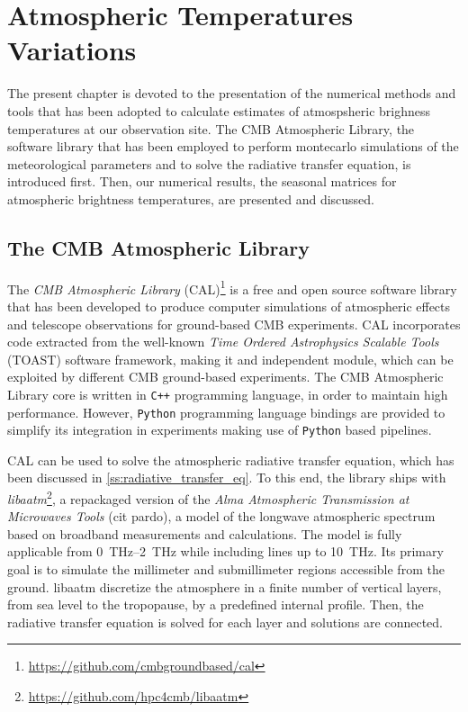 \chapter{Atmospheric Temperatures Variations}\label{ch:atm_variations}

The present chapter is devoted to the presentation of the numerical methods
and tools that has been adopted to calculate estimates of atmospsheric
brighness temperatures at our observation site. The CMB Atmospheric
Library, the software library that has been employed to perform
montecarlo simulations of the meteorological parameters and to solve the
radiative transfer equation, is introduced first. Then, our numerical
results, the seasonal matrices for atmospheric brightness
temperatures, are presented and discussed.

\section{The CMB Atmospheric Library}

The \emph{CMB Atmospheric Library}
(CAL)\footnote{\url{https://github.com/cmbgroundbased/cal}} is a free and
open source software library that has been developed to produce computer
simulations of atmospheric effects and telescope observations for
ground-based CMB experiments. CAL incorporates code extracted from the
well-known \emph{Time Ordered Astrophysics Scalable Tools} (TOAST) software
framework, making it and independent module, which can be exploited by
different CMB ground-based experiments. The CMB Atmospheric Library core is
written in \texttt{C++} programming language, in order to maintain high
performance.  However, \texttt{Python} programming language bindings are
provided to simplify its integration in experiments making use of
\texttt{Python} based pipelines.

CAL can be used to solve the atmospheric radiative transfer equation, which
has been discussed in \autoref{ss:radiative_transfer_eq}. To this end, the
library ships with
\emph{libaatm}\footnote{\url{https://github.com/hpc4cmb/libaatm}}, a
repackaged version of the \emph{Alma Atmospheric Transmission at Microwaves
Tools} (cit pardo), a model of the longwave atmospheric spectrum based on
broadband measurements and calculations. The model is fully applicable from
\SIrange{0}{2}{\tera\hertz} while including lines up to
\SI{10}{\tera\hertz}. Its primary goal is to simulate the
millimeter and submillimeter regions accessible from the ground.
libaatm discretize the atmosphere in a finite number of vertical
layers, from sea level to the tropopause, by a predefined internal profile.
Then, the radiative transfer equation is solved for each layer and
solutions are connected.

